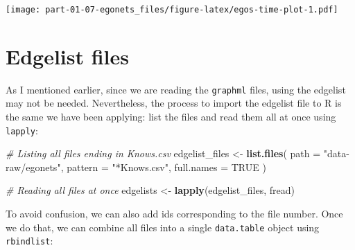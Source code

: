 \documentclass[
]{book}
\newenvironment{Shaded}{\begin{snugshade}}{\end{snugshade}}
\newcommand{\AttributeTok}[1]{\textcolor[rgb]{0.13,0.29,0.53}{#1}}
\newcommand{\CommentTok}[1]{\textcolor[rgb]{0.56,0.35,0.01}{\textit{#1}}}
\newcommand{\ConstantTok}[1]{\textcolor[rgb]{0.56,0.35,0.01}{#1}}
\newcommand{\FunctionTok}[1]{\textcolor[rgb]{0.13,0.29,0.53}{\textbf{#1}}}
\newcommand{\NormalTok}[1]{#1}
\newcommand{\OtherTok}[1]{\textcolor[rgb]{0.56,0.35,0.01}{#1}}
\newcommand{\StringTok}[1]{\textcolor[rgb]{0.31,0.60,0.02}{#1}}
\begin{document}
\texttt{[image: part-01-07-egonets\_files/figure-latex/egos-time-plot-1.pdf]}

\hypertarget{edgelist-files}{%
\section{Edgelist files}\label{edgelist-files}}

As I mentioned earlier, since we are reading the \texttt{graphml} files, using the edgelist may not be needed. Nevertheless, the process to import the edgelist file to R is the same we have been applying: list the files and read them all at once using \texttt{lapply}:

\begin{Shaded}
\begin{Highlighting}[]
\CommentTok{\# Listing all files ending in Knows.csv}
\NormalTok{edgelist\_files }\OtherTok{\textless{}{-}} \FunctionTok{list.files}\NormalTok{(}
  \AttributeTok{path =} \StringTok{"data{-}raw/egonets"}\NormalTok{,}
  \AttributeTok{pattern =} \StringTok{"*Knows.csv"}\NormalTok{,}
  \AttributeTok{full.names =} \ConstantTok{TRUE}
\NormalTok{  )}

\CommentTok{\# Reading all files at once}
\NormalTok{edgelists }\OtherTok{\textless{}{-}} \FunctionTok{lapply}\NormalTok{(edgelist\_files, fread)}
\end{Highlighting}
\end{Shaded}

To avoid confusion, we can also add ids corresponding to the file number. Once we do that, we can combine all files into a single \texttt{data.table} object using \texttt{rbindlist}:
\end{document}
